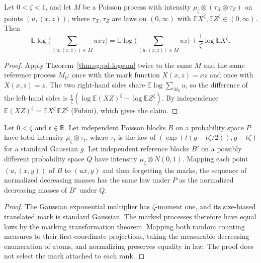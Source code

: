 \begin{theorem}\label{thm:sg:pd-logsum-mul}
  \leanok
Let $0<\zeta<1$, and let $M$ be a Poisson process with intensity $\mu_\zeta\otimes(\tau_X\otimes\tau_Z)$ on points $(u,(x,z))$, where $\tau_X,\tau_Z$ are laws on $(0,\infty)$ with $\mathbb EX^\zeta,\mathbb EZ^\zeta\in(0,\infty)$. Then
\[\mathbb E\log\Big(\sum_{(u,(x,z))\in M}uxz\Big)=\mathbb E\log\Big(\sum_{(u,(x,z))\in M}uz\Big)+\frac1\zeta\log\mathbb EX^\zeta.\]
\end{theorem}

\begin{proof}
  \leanok
{}
Apply Theorem~\ref{thm:sg:pd-logsum} twice to the same $M$ and the same reference process $M_0$: once with the mark function $X(x,z)=xz$ and once with $X(x,z)=z$. The two right-hand sides share $\mathbb E\log\sum_{M_0}u$, so the difference of the left-hand sides is $\frac1\zeta(\log\mathbb E(XZ)^\zeta-\log\mathbb EZ^\zeta)$. By independence $\mathbb E(XZ)^\zeta=\mathbb EX^\zeta\,\mathbb EZ^\zeta$ (Fubini), which gives the claim.
\end{proof}

\begin{theorem}\label{thm:sg:pd-gaussian-weights}
  \leanok
Let $0<\zeta$ and $t\in\mathbb R$. Let independent Poisson blocks $B$ on a probability space $P$ have total intensity $\mu_\zeta\otimes\tau_t$, where $\tau_t$ is the law of $(\exp(t(g-t\zeta/2)),g-t\zeta)$ for a standard Gaussian $g$. Let independent reference blocks $B'$ on a possibly different probability space $Q$ have intensity $\mu_\zeta\otimes N(0,1)$. Mapping each point $(u,(x,y))$ of $B$ to $(ux,y)$ and then forgetting the marks, the sequence of normalized decreasing masses has the same law under $P$ as the normalized decreasing masses of $B'$ under $Q$.
\end{theorem}
\begin{proof}
  \leanok
The Gaussian exponential multiplier has $\zeta$-moment one, and its size-biased translated mark is standard Gaussian. The marked processes therefore have equal laws by the marking transformation theorem. Mapping both random counting measures to their first-coordinate projections, taking the measurable decreasing enumeration of atoms, and normalizing preserves equality in law. The proof does not select the mark attached to each rank.
\end{proof}

